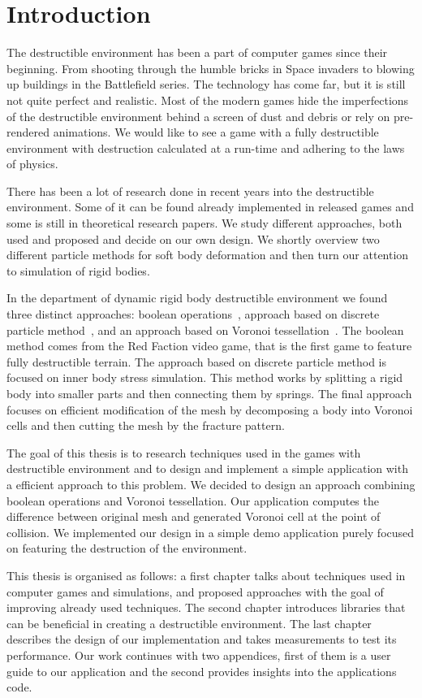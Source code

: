 \chapter*{Introduction}

The destructible environment has been a part of computer games since their beginning. From shooting through the humble bricks in Space invaders to blowing up buildings in the Battlefield series. The technology has come far, but it is still not quite perfect and realistic. Most of the modern games hide the imperfections of the destructible environment behind a screen of dust and debris or rely on pre-rendered animations. We would like to see a game with a fully destructible environment with destruction calculated at a run-time and adhering to the laws of physics.

There has been a lot of research done in recent years into the destructible environment. Some of it can be found already implemented in released games and some is still in theoretical research papers. We study different approaches, both used and proposed and decide on our own design. We shortly overview two different particle methods for soft body deformation and then turn our attention to simulation of rigid bodies. 

In the department of dynamic rigid body destructible environment we found three distinct approaches: boolean operations~\cite{geomod}, approach based on discrete particle method~\cite{edem}, and an approach based on Voronoi tessellation~\cite{nvidia}. The boolean method comes from the Red Faction video game, that is the first game to feature fully destructible terrain. The approach based on discrete particle method is focused on inner body stress simulation. This method works by splitting a rigid body into smaller parts and then connecting them by springs. The final approach focuses on efficient modification of the mesh by decomposing a body into Voronoi cells and then cutting the mesh by the fracture pattern.

The goal of this thesis is to research techniques used in the games with destructible environment and to design and implement a simple application with a efficient approach to this problem. We decided to design an approach combining boolean operations and Voronoi tessellation. Our application computes the difference between original mesh and generated Voronoi cell at the point of collision. We implemented our design in a simple demo application purely focused on featuring the destruction of the environment.

This thesis is organised as follows: a first chapter talks about techniques used in computer games and simulations, and proposed approaches with the goal of improving already used techniques. The second chapter introduces libraries that can be beneficial in creating a destructible environment. The last chapter describes the design of our implementation and takes measurements to test its performance. Our work continues with two appendices, first of them is a user guide to our application and the second provides insights into the applications code. 

